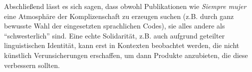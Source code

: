 Abschließend lässt es sich sagen, dass obwohl Publikationen wie \textit{Siempre mujer} eine Atmosphäre der Komplizenschaft zu erzeugen suchen (z.B. durch ganz bewusste Wahl der eingesetzten sprachlichen Codes), sie alles andere als ``schwesterlich'' sind.
Eine echte Solidarität, z.B. auch aufgrund geteilter linguistischen Identität, kann erst in Kontexten beobachtet werden, die nicht künstlich Verunsicherungen erschaffen, um dann Produkte anzubieten, die diese verbessern sollten.


\begin{comment}
    ``Frauenzeitschriften'' als ``synthetic sisterhood''
\cite{Talbot95}
"how this imaginary community is established: the simulation of a friendly relationship. I conclude with some discussion of how "unsisterly" this feature really is"

"This discursively organized social space called femininity is articulated in commercial and mass-media discourses — especiall in the magazine, clothng, and cosmetics industries."

"Readers are drawn into a kind of complicity with the texts they read."

"In the late 1930s, magazines began to carry consumer features, in which advertising is presented as part of the editorial content. As this brief history suggests, the women's magazine has developed in the context of patriarchal and capitalist social relations."

"Of particular relevance here is women's work on their own bodies as objects to be looked at and their use of commodities, tha is, women's activities as consumers who feminize themselves. Magazines for women contain informative and facilitative elements on fahion and beauty products and their use, which appear both in advertisements and in sonsumer features produced by the editorial board."

"An important element of feminizing practices is the concept of a woman as a visible object requiring work."

"This itemization has been intensified by an endless proliferation of products by manufacturers and accompanying distinctions among colors, sking types, hair types, and so on."

"Magazines are therefore constructed within the relationship among staff, publisher, and manufacturers;"

"According to Angela McRobbie (1978:3; original emphasis), \textit{Jackie} presented its teenage readers with a "\textit{false} sisterhood" and imposed an ideology of femininity that isolated women from one another; "(1) The girls are being invited to join a close, intimate sorority where secrets can be exchanged and advice given; and (2) they are also being presnted with an ideological bloc of mammoth proportions, one which \textit{imprisons} them in a claustrophobic world of jealousy and competitiveness, the most unsisterly of emotions, to say the least.""


\end{comment}
